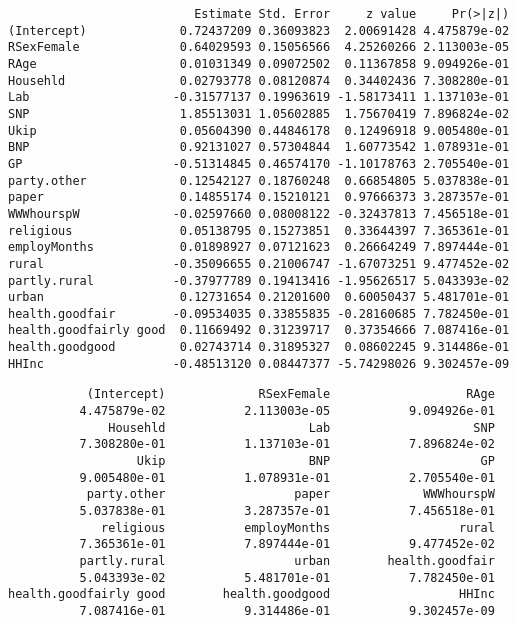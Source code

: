 \documentclass[]{article}
\newenvironment{Shaded}{\begin{snugshade}}{\end{snugshade}}
\newcommand{\CommentTok}[1]{\textcolor[rgb]{0.56,0.35,0.01}{\textit{#1}}}
\newcommand{\DecValTok}[1]{\textcolor[rgb]{0.00,0.00,0.81}{#1}}
\newcommand{\KeywordTok}[1]{\textcolor[rgb]{0.13,0.29,0.53}{\textbf{#1}}}
\newcommand{\NormalTok}[1]{#1}
\newcommand{\OperatorTok}[1]{\textcolor[rgb]{0.81,0.36,0.00}{\textbf{#1}}}
\begin{document}
\begin{verbatim}
                          Estimate Std. Error     z value     Pr(>|z|)
(Intercept)             0.72437209 0.36093823  2.00691428 4.475879e-02
RSexFemale              0.64029593 0.15056566  4.25260266 2.113003e-05
RAge                    0.01031349 0.09072502  0.11367858 9.094926e-01
Househld                0.02793778 0.08120874  0.34402436 7.308280e-01
Lab                    -0.31577137 0.19963619 -1.58173411 1.137103e-01
SNP                     1.85513031 1.05602885  1.75670419 7.896824e-02
Ukip                    0.05604390 0.44846178  0.12496918 9.005480e-01
BNP                     0.92131027 0.57304844  1.60773542 1.078931e-01
GP                     -0.51314845 0.46574170 -1.10178763 2.705540e-01
party.other             0.12542127 0.18760248  0.66854805 5.037838e-01
paper                   0.14855174 0.15210121  0.97666373 3.287357e-01
WWWhourspW             -0.02597660 0.08008122 -0.32437813 7.456518e-01
religious               0.05138795 0.15273851  0.33644397 7.365361e-01
employMonths            0.01898927 0.07121623  0.26664249 7.897444e-01
rural                  -0.35096655 0.21006747 -1.67073251 9.477452e-02
partly.rural           -0.37977789 0.19413416 -1.95626517 5.043393e-02
urban                   0.12731654 0.21201600  0.60050437 5.481701e-01
health.goodfair        -0.09534035 0.33855835 -0.28160685 7.782450e-01
health.goodfairly good  0.11669492 0.31239717  0.37354666 7.087416e-01
health.goodgood         0.02743714 0.31895327  0.08602245 9.314486e-01
HHInc                  -0.48513120 0.08447377 -5.74298026 9.302457e-09
\end{verbatim}

\begin{Shaded}
\end{Shaded}

\begin{verbatim}
           (Intercept)             RSexFemale                   RAge 
          4.475879e-02           2.113003e-05           9.094926e-01 
              Househld                    Lab                    SNP 
          7.308280e-01           1.137103e-01           7.896824e-02 
                  Ukip                    BNP                     GP 
          9.005480e-01           1.078931e-01           2.705540e-01 
           party.other                  paper             WWWhourspW 
          5.037838e-01           3.287357e-01           7.456518e-01 
             religious           employMonths                  rural 
          7.365361e-01           7.897444e-01           9.477452e-02 
          partly.rural                  urban        health.goodfair 
          5.043393e-02           5.481701e-01           7.782450e-01 
health.goodfairly good        health.goodgood                  HHInc 
          7.087416e-01           9.314486e-01           9.302457e-09 
\end{verbatim}
\end{document}
